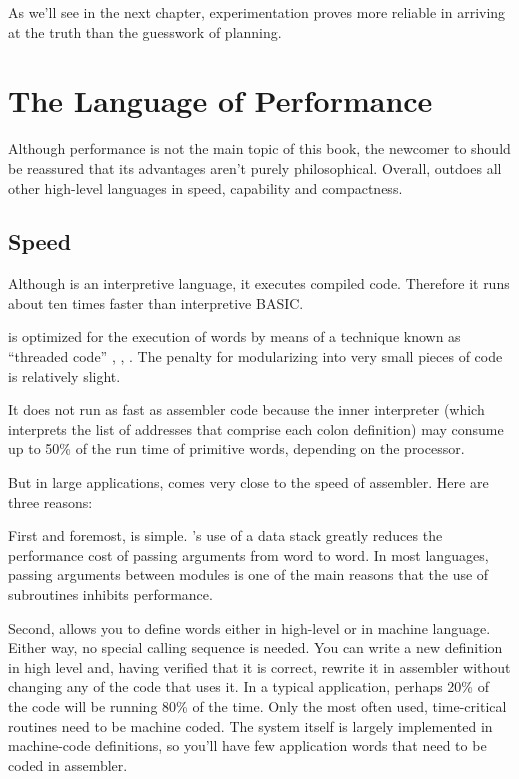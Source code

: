 As we'll see in the next chapter, experimentation proves more reliable
in arriving at the truth than the guesswork of planning.%


\section{The Language of Performance}%
%
Although performance is not the main topic of this book, the newcomer
to \Forth{} should be reassured that its advantages aren't purely
philosophical.  Overall, \Forth{} outdoes all other high-level languages
in speed, capability and compactness.


\subsection{Speed}%
%
Although \Forth{} is an interpretive language, it executes compiled code.
Therefore it runs about ten times faster than interpretive BASIC.

\Forth{} is optimized for the execution of words by means of a technique
known as ``threaded code'' \cite{bell72}, \cite{dewar},
\cite{kogge82}. The penalty for modularizing into very small pieces of
code is relatively slight.

It does not run as fast as assembler code because the inner
interpreter (which interprets the list of addresses that comprise each
colon definition) may consume up to 50\% of the run time of primitive
words, depending on the processor.

But in large applications, \Forth{} comes very close to the speed of
assembler. Here are three reasons:

First and foremost, \Forth{} is simple. \Forth{}'s use of a data stack%
greatly reduces the performance cost of passing arguments from word to
word. In most languages, passing arguments between modules is one of
the main reasons that the use of subroutines inhibits performance.

Second, \Forth{} allows you to define words either in high-level or in
machine language. Either way, no special calling sequence is needed.
You can write a new definition in high level and, having verified that
it is correct, rewrite it in assembler without changing any of the
code that uses it. In a typical application, perhaps 20\% of the code
will be running 80\% of the time. Only the most often used,
time-critical routines need to be machine coded. The \Forth{} system
itself is largely implemented in machine-code definitions, so you'll
have few application words that need to be coded in assembler.

